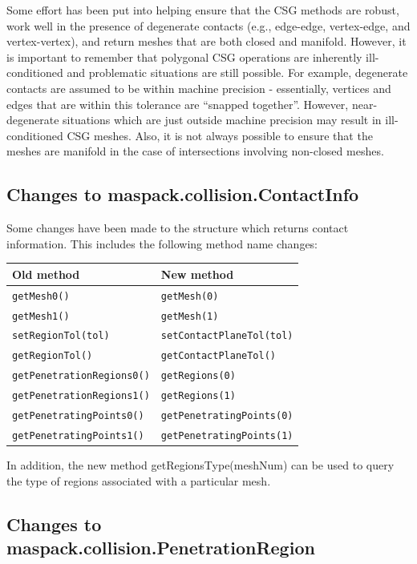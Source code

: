 \documentclass{article}
\begin{document}
Some effort has been put into helping ensure that the CSG methods are
robust, work well in the presence of degenerate contacts (e.g.,
edge-edge, vertex-edge, and vertex-vertex), and return meshes that are
both closed and manifold. However, it is important to remember that
polygonal CSG operations are inherently ill-conditioned and
problematic situations are still possible. For example, degenerate
contacts are assumed to be within machine precision - essentially,
vertices and edges that are within this tolerance are ``snapped
together''. However, near-degenerate situations which are just outside
machine precision may result in ill-conditioned CSG meshes.  Also, it
is not always possible to ensure that the meshes are manifold in the
case of intersections involving non-closed meshes.

\subsection*{Changes to maspack.collision.ContactInfo}

Some changes have been made to the
 structure which returns
contact information. This includes the following method name changes:

\begin{tabular}{ll}
\hline
Old method & New method \\
\hline
{\tt getMesh0()} & {\tt getMesh(0)}\\
{\tt getMesh1()} & {\tt getMesh(1)}\\
{\tt setRegionTol(tol)} & {\tt setContactPlaneTol(tol)}\\
{\tt getRegionTol()} & {\tt getContactPlaneTol()}\\
{\tt getPenetrationRegions0()} & {\tt getRegions(0)}\\
{\tt getPenetrationRegions1()} & {\tt getRegions(1)}\\
{\tt getPenetratingPoints0()} & {\tt getPenetratingPoints(0)}\\
{\tt getPenetratingPoints1()} & {\tt getPenetratingPoints(1)}\\
\hline
\end{tabular}

In addition, the new method
%
{getRegionsType(meshNum)} can be used to query the type of regions
associated with a particular mesh.

\subsection*{Changes to maspack.collision.PenetrationRegion}
\end{document}
